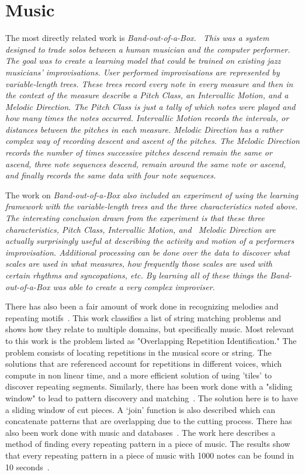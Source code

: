 \documentclass[12pt]{ucthesis}
\begin{document}
\section{Music}
\label{rw:music}
The most directly related work is \em{Band-out-of-a-Box}\em.~\cite{bob} This was a system designed to trade solos between a human musician and the computer performer. The goal was to create a learning model that could be trained on existing jazz musicians' improvisations. User performed improvisations are represented by variable-length trees. These trees record every note in every measure and then in the context of the measure describe a \em{Pitch Class, }\em an \em{Intervallic Motion, }\em and a \em{Melodic Direction. }\em The \em{Pitch Class }\em is just a tally of which notes were played and how many times the notes occurred. \em{Intervallic Motion }\em records the intervals, or distances between the pitches in each measure.  \em{Melodic Direction }\em has a rather complex way of recording descent and ascent of the pitches.  The \em{Melodic Direction }\em records the number of times successive pitches descend remain the same or ascend, three note sequences descend, remain around the same note or ascend, and finally records the same data with four note sequences. 

The work on \em{Band-out-of-a-Box }\em also included an experiment of using the learning framework with the variable-length trees and the three characteristics noted above. The interesting conclusion drawn from the experiment is that these three characteristics, \em{Pitch Class, Intervallic Motion, }\em and  ~\em{Melodic Direction }\em are actually surprisingly useful at describing the activity and motion of a performers improvisation. Additional processing can be done over the data to discover what scales are used in what measures, how frequently those scales are used with certain rhythms and syncopations, etc. By learning all of these things the \em{Band-out-of-a-Box }\em was able to create a very complex improviser.

There has also been a fair amount of work done in recognizing melodies and repeating motifs~\cite{MelodicRecognition}. This work classifies a list of string matching problems and shows how they relate to multiple domains, but specifically music. Most relevant to this work is the problem listed as "Overlapping Repetition Identification." The problem consists of locating repetitions in the musical score or string. The solutions that are referenced account for repetitions in different voices, which compute in non linear time, and a more efficient solution of using 'tiles' to discover repeating segments. Similarly, there has been work done with a "sliding window" to lead to pattern discovery and matching~\cite{slidingWindow}. The solution here is to have a sliding window of cut pieces. A `join' function is also described which can concatenate patterns that are overlapping due to the cutting process. There has also been work done with music and databases~\cite{musicDB}. The work here describes a method of finding every repeating pattern in a piece of music. The results show that every repeating pattern in a piece of music with 1000 notes can be found in 10 seconds~\cite{musicDB}.
\end{document}
